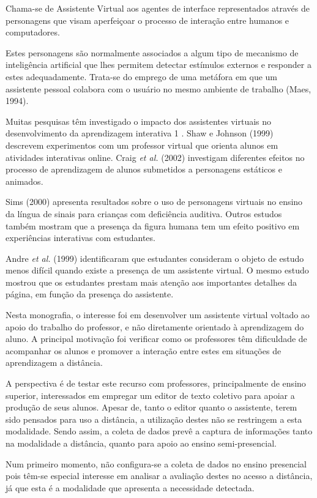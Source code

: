 Chama-se de Assistente Virtual aos agentes de interface representados através de personagens que visam aperfeiçoar o processo de interação entre humanos e computadores.

Estes personagens são normalmente associados a algum tipo de mecanismo de inteligência artificial que lhes permitem detectar estímulos externos e responder a estes adequadamente. Trata-se do emprego de uma metáfora em que um assistente pessoal colabora com o usuário no mesmo ambiente de trabalho (Maes, 1994).

Muitas pesquisas têm investigado o impacto dos assistentes virtuais no desenvolvimento da aprendizagem interativa 1 . Shaw e Johnson (1999) descrevem experimentos com um professor virtual que orienta alunos em atividades interativas online. Craig \textit{et al.} (2002) investigam diferentes efeitos no processo de aprendizagem de alunos submetidos a personagens estáticos e animados.

Sims (2000) apresenta resultados sobre o uso de personagens virtuais no ensino da língua de sinais para crianças com deficiência auditiva. Outros estudos também mostram que a presença da figura humana tem um efeito positivo em experiências interativas com estudantes.

Andre \textit{et al.} (1999) identificaram que estudantes consideram o objeto de estudo menos difícil quando existe a presença de um assistente virtual. O mesmo estudo mostrou que os estudantes prestam mais atenção aos importantes detalhes da página, em função da presença do assistente.

Nesta monografia, o interesse foi em desenvolver um assistente virtual voltado ao apoio do trabalho do professor, e não diretamente orientado à aprendizagem do aluno. A principal motivação foi verificar como os professores têm dificuldade de acompanhar os alunos e promover a interação entre estes em situações de aprendizagem a distância. 

A perspectiva é de testar este recurso com professores, principalmente de ensino superior, interessados em empregar um editor de texto coletivo para apoiar a produção de seus alunos. Apesar de, tanto o editor quanto o assistente, terem sido pensados para uso a distância, a utilização destes não se restringem a esta modalidade. Sendo assim, a coleta de dados prevê a captura de informações tanto na modalidade a distância, quanto para apoio ao ensino semi-presencial.

Num primeiro momento, não configura-se a coleta de dados no ensino presencial pois têm-se especial interesse em analisar a avaliação destes no acesso a distância, já que esta é a modalidade que apresenta a necessidade detectada.

